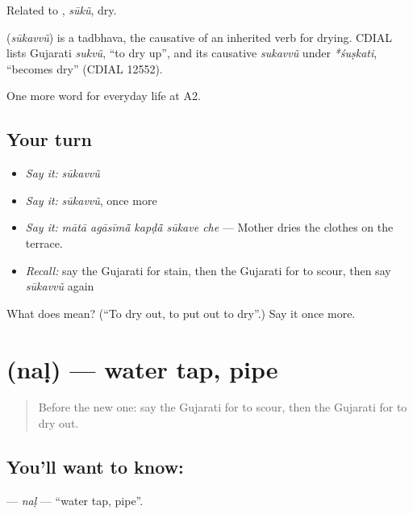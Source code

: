 Related to \textbf{}, \emph{sūkũ}, dry.

\begin{cousinweb}
\textbf{} (\emph{sūkavvũ}) is a tadbhava, the causative of an inherited verb for drying. CDIAL lists Gujarati \emph{sukvũ}, \textquotedblleft{}to dry up\textquotedblright{}, and its causative \emph{sukavvũ} under \emph{*śuṣkati}, \textquotedblleft{}becomes dry\textquotedblright{} (CDIAL 12552).
\end{cousinweb}

\begin{grammarlens}[title={What you've built}]
One more word for everyday life at A2.
\end{grammarlens}

\subsection*{Your turn}
\begin{itemize}
\raggedright
  \item \emph{Say it:} \emph{sūkavvũ}
  \item \emph{Say it:} \emph{sūkavvũ}, once more
  \item \emph{Say it:} \emph{mātā agāsīmā̃ kapḍā̃ sūkave che} — Mother dries the clothes on the terrace.
  \item \emph{Recall:} say the Gujarati for stain, then the Gujarati for to scour, then say \emph{sūkavvũ} again
\end{itemize}

\begin{tcolorbox}[breakable,colback=teal!4,colframe=teal!35!black,title={Before you move on}]
What does  mean? (\textquotedblleft{}To dry out, to put out to dry\textquotedblright{}.) Say it once more.
\end{tcolorbox}
\section[\texorpdfstring{\gu{નળ} (naḷ)}{નળ (naḷ)}]{ (naḷ) — water tap, pipe}

\label{lesson:GU-C159-nal}



\begin{quote}
Before the new one: say the Gujarati for to scour, then the Gujarati for to dry out.
\end{quote}

\subsection*{You'll want to know: }
\textbf{} — \emph{naḷ} — \textquotedblleft{}water tap, pipe\textquotedblright{}.

